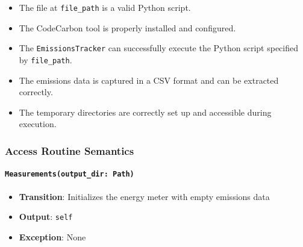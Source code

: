 \documentclass[12pt, titlepage]{article}
\begin{document}
\begin{itemize}
\item The file at \texttt{file\_path} is a valid Python script.
\item The CodeCarbon tool is properly installed and configured.
\item The \texttt{EmissionsTracker} can successfully execute the Python script specified by \texttt{file\_path}.
\item The emissions data is captured in a CSV format and can be extracted correctly.
\item The temporary directories are correctly set up and accessible during execution.
\end{itemize}

\subsubsection{Access Routine Semantics}

\paragraph{\texttt{Measurements(output\_dir: Path)}}
\begin{itemize}
\item \textbf{Transition}: Initializes the energy meter with empty emissions data
\item \textbf{Output}: \texttt{self}
\item \textbf{Exception}: None
\end{itemize}
\end{document}
